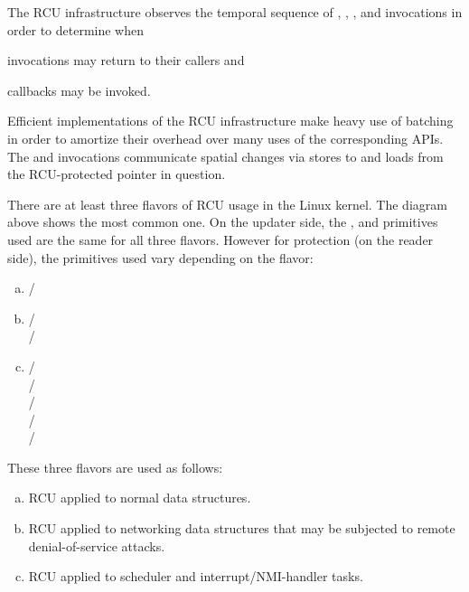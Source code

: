 The RCU infrastructure observes the temporal sequence of ,
, , and  invocations in
order to determine when
\begin{enumerate*}[(1)]
\item {} invocations may return
to their callers and
\item {} callbacks may be invoked.
\end{enumerate*}
Efficient
implementations of the RCU infrastructure make heavy use of batching in
order to amortize their overhead over many uses of the corresponding APIs.
The  and  invocations communicate
spatial changes via stores to and loads from the RCU-protected pointer in
question.

There are at least three flavors of RCU usage in the Linux kernel.
The diagram
above shows the most common one.
On the updater side, the ,
 and  primitives used are the same for all three
flavors.
However for protection (on the reader side), the primitives used vary
depending on the flavor:

\begin{enumerate}[(a)]
\item	{} /  \\

\item	{} /  \\
	 /  \\

\item	{} /  \\
	 /  \\
	 /  \\
	 /  \\
	 /  \\
\end{enumerate}

These three flavors are used as follows:

\begin{enumerate}[(a)]
\item	RCU applied to normal data structures.

\item	RCU applied to networking data structures that may be subjected
	to remote denial-of-service attacks.

\item	RCU applied to scheduler and interrupt/NMI-handler tasks.
\end{enumerate}

